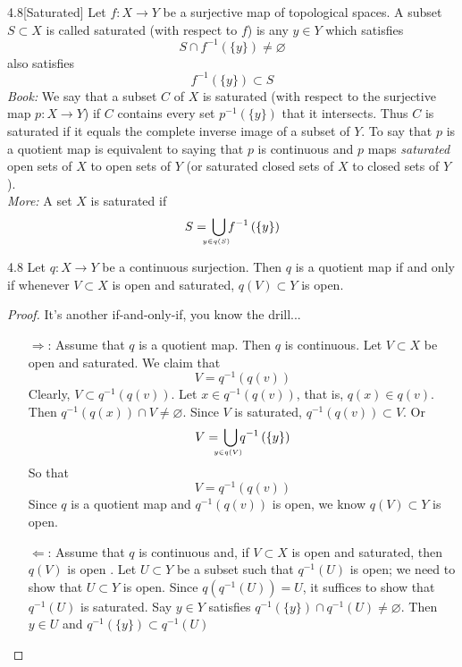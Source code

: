\begin{customdefinition}{4.8}[Saturated]
Let $f: X \longrightarrow Y$ be a surjective map of topological spaces. A subset $S \subset X$ is called saturated (with respect to $f$) is any $y \in Y$ which satisfies 
$$S \cap f^{-1}\left(\{y\}\right) \neq \varnothing$$
also satisfies 
$$f^{-1}\left(\{y\}\right) \subset S$$
\emph{Book:} We say that a subset $C$ of $X$ is saturated (with respect to the surjective map $p: X\longrightarrow Y$) if $C$ contains every set $p^{-1} \left(\{y\}\right)$ that it intersects. Thus $C$ is saturated if it equals the complete inverse image of a subset of $Y$. To say that $p$ is a quotient map is equivalent to saying that $p$ is continuous and $p$ maps \emph{saturated} open sets of $X$ to open sets of $Y$ (or saturated closed sets of $X$ to closed sets of $Y$).\\
\emph{More:} A set $X$ is saturated if
    $$S = \underaccent{y\in q(S)}{\bigcup}f^{-1}\left(\{y\}\right)$$
\end{customdefinition}

\begin{customlemma}{4.8}
Let $q: X \longrightarrow Y$ be a continuous surjection. Then $q$ is a quotient map if and only if whenever $V \subset X$ is open and saturated, $q(V) \subset Y$ is open.
\end{customlemma}

\begin{proof}It's another if-and-only-if, you know the drill...
\begin{enumerate}
    \item[$\Longrightarrow$: ] Assume that $q$ is a quotient map. Then $q$ is continuous. Let $V \subset X$ be open and saturated. We claim that
    $$V = q^{-1}\left(q(v)\right)$$
    Clearly, $V \subset q^{-1}\left(q(v)\right)$. Let $x \in q^{-1}\left(q(v)\right)$, that is, $q(x) \in q(v)$. Then $q^{-1}\left(q(x)\right) \cap V \neq \varnothing$. Since $V$ is saturated, $q^{-1}\left(q(v)\right) \subset V$. Or
    $$V = \underaccent{y\in q(V)}{\bigcup}q^{-1}\left(\{y\}\right)$$
    So that 
    $$V = q^{-1}\left(q(v)\right)$$
    Since $q$ is a quotient map and $q^{-1}\left(q(v)\right)$ is open, we know $q\left(V\right) \subset Y$ is open.
    
    \item[$\Longleftarrow$: ]Assume that $q$ is continuous and, if $V \subset X$ is open and saturated, then $q(V)$ is open . Let $U \subset Y$ be a subset such that $q^{-1}(U)$ is open; we need to show that $U \subset Y$ is open. Since $q\left(q^{-1}(U)\right) = U$, it suffices to show that $q^{-1}(U)$ is saturated. Say $y \in Y$ satisfies $q^{-1}\left(\{y\}\right) \cap q^{-1}(U) \neq \varnothing$. Then $y \in U$ and $q^{-1}\left(\{y\}\right) \subset q^{-1}(U)$
\end{enumerate}
\end{proof}

